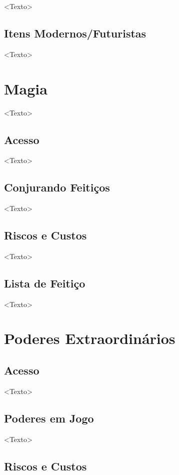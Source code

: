 \documentclass[a4paper, twocolumn, 10pt]{book}
\begin{document}
<Texto>

\section{Itens Modernos/Futuristas}

<Texto>

\chapter{Magia}

<Texto>

\section{Acesso}

<Texto>

\section{Conjurando Feitiços}

<Texto>

\section{Riscos e Custos}

<Texto>

\section{Lista de Feitiço}

<Texto>

\chapter{Poderes Extraordinários}

\section{Acesso}

<Texto>

\section{Poderes em Jogo}

<Texto>

\section{Riscos e Custos}
\end{document}
